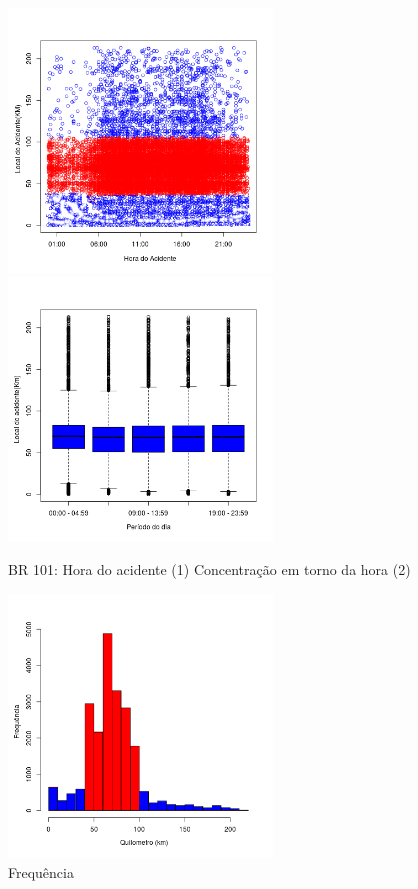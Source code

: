 \begin{figure}[h]
	\caption{BR 101: Hora do acidente (1) Concentração em torno da hora (2)}
	\includegraphics[width=7cm,height=7cm]{Figuras/Preprocess/br101.png}
	\includegraphics[width=7cm,height=7cm]{Figuras/Preprocess/br101_2.png}
	
\end{figure}

\quad \quad
\begin{figure}[h]
	\centering
	\caption{ Frequência}
	\includegraphics[width=7cm,height=7cm]{Figuras/Preprocess/br101_4.png}
\end{figure}

